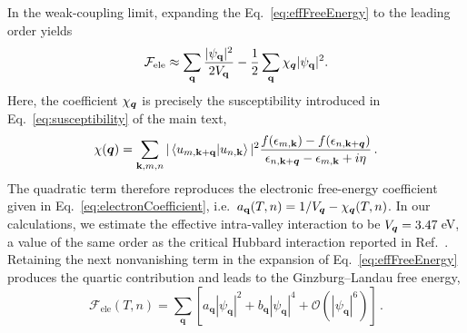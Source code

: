 \documentclass[aps,prx,article,twocolumn,amsmath,amssymb,superscriptaddress,longbibliography]{revtex4-2}
\begin{document}
In the weak-coupling limit, expanding the Eq.~\eqref{eq:effFreeEnergy} to the leading order yields
\begin{equation}\label{eq:appQuadraticTrace}
\mathcal F_{\mathrm{ele}}\approx\sum_{\mathbf q}\frac{|\psi_{\mathbf q}|^2}{2V_{\mathbf q}}-\frac{1}{2}\sum_{\mathbf q}\chi_{\vb*{q}}|\psi_{\mathbf q}|^2.
\end{equation}
Here, the coefficient $\chi_{\vb*{q}}$ is precisely the susceptibility introduced in Eq.~\eqref{eq:susceptibility} of the main text,
\begin{align}
\chi({\vb*{q}}) =\sum_{\mathbf{k},m,n}|\left\langle u_{m,\mathbf k+\mathbf q} \middle| u_{n,\mathbf k}\right\rangle|^2\frac{f(\epsilon_{m,\mathbf{k}})-f(\epsilon_{n,\mathbf{k}+{\vb*{q}}})}{\epsilon_{n,\mathbf{k}+{\vb*{q}}}-\epsilon_{m,\mathbf{k}}+i\eta}\,.
\end{align}
The quadratic term therefore reproduces the electronic free-energy coefficient given in Eq.~\eqref{eq:electronCoefficient}, i.e.~$a_{\mathbf q}(T,n) = 1/V_{\vb*{q}} - \chi_{\vb*{q}}(T,n)$. In our calculations, we estimate the effective intra-valley interaction to be $V_{\vb*{q}} = 3.47$\,eV, a value of the same order as the critical Hubbard interaction reported in Ref.~. Retaining the next nonvanishing term in the expansion of Eq.~\eqref{eq:effFreeEnergy} produces the quartic contribution and leads to the Ginzburg--Landau free energy,
\begin{equation}
\mathcal F_{\mathrm{ele}}(T,n)=\sum_{\mathbf{q}}\left[a_{\mathbf q}|\psi_{\mathbf q}|^2+b_{\mathbf q}|\psi_{\mathbf q}|^4+\mathcal{O}(|\psi_{\mathbf q}|^6)\right]\,.
\end{equation}
 
\end{document}
